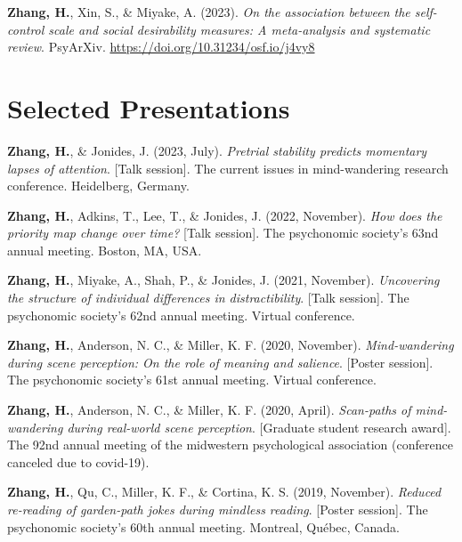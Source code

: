 \documentclass[11pt,a4paper,]{awesome-cv}
\begin{document}
\leavevmode{}%
\textbf{Zhang, H.}, Xin, S., \& Miyake, A. (2023). \emph{On the
association between the self-control scale and social desirability
measures: A meta-analysis and systematic review}. PsyArXiv.
\url{https://doi.org/10.31234/osf.io/j4vy8}

\hypertarget{selected-presentations}{%
\section{Selected Presentations}\label{selected-presentations}}

\hypertarget{bibliography}{}
\leavevmode{}%
\textbf{Zhang, H.}, \& Jonides, J. (2023, July). \emph{Pretrial
stability predicts momentary lapses of attention}. {[}Talk session{]}.
The current issues in mind-wandering research conference. Heidelberg,
Germany.

\leavevmode{}%
\textbf{Zhang, H.}, Adkins, T., Lee, T., \& Jonides, J. (2022,
November). \emph{How does the priority map change over time?} {[}Talk
session{]}. The psychonomic society's 63nd annual meeting. Boston, MA,
USA.

\leavevmode{}%
\textbf{Zhang, H.}, Miyake, A., Shah, P., \& Jonides, J. (2021,
November). \emph{Uncovering the structure of individual differences in
distractibility}. {[}Talk session{]}. The psychonomic society's 62nd
annual meeting. Virtual conference.

\leavevmode{}%
\textbf{Zhang, H.}, Anderson, N. C., \& Miller, K. F. (2020, November).
\emph{Mind-wandering during scene perception: On the role of meaning and
salience}. {[}Poster session{]}. The psychonomic society's 61st annual
meeting. Virtual conference.

\leavevmode{}%
\textbf{Zhang, H.}, Anderson, N. C., \& Miller, K. F. (2020, April).
\emph{Scan-paths of mind-wandering during real-world scene perception}.
{[}Graduate student research award{]}. The 92nd annual meeting of the
midwestern psychological association (conference canceled due to
covid-19).

\leavevmode{}%
\textbf{Zhang, H.}, Qu, C., Miller, K. F., \& Cortina, K. S. (2019,
November). \emph{Reduced re-reading of garden-path jokes during mindless
reading}. {[}Poster session{]}. The psychonomic society's 60th annual
meeting. Montreal, Québec, Canada.
\end{document}
